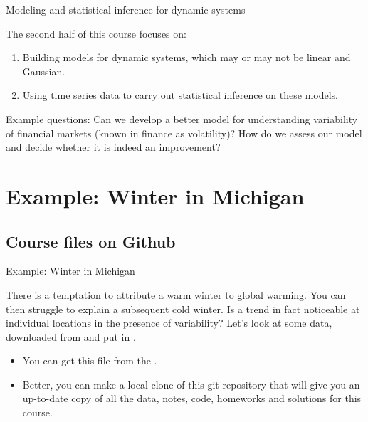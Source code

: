 \begin{frame}{Modeling and statistical inference for dynamic systems}

The second half of this course focuses on:
\begin{enumerate}
\item
 Building models for dynamic systems, which may or may not be linear and Gaussian.
\item
Using time series data to carry out statistical inference on these models.
\end{enumerate}

Example questions: Can we develop a better model for understanding variability of financial markets (known in finance as volatility)? How do we assess our model and decide whether it is indeed an improvement?

\end{frame}

\section{Example: Winter in Michigan}

\subsection{Course files on Github}

\begin{frame}[fragile]{Example: Winter in Michigan}

There is a temptation to attribute a warm winter to global warming. You can then struggle to explain a subsequent cold winter. Is a trend in fact noticeable at individual locations in the presence of variability? Let's look at some data, downloaded from  and put in . 

\begin{itemize}

\item You can get this file from the .

\item Better, you can make a local clone of this git repository that will give you an up-to-date copy of all the data, notes, code, homeworks and solutions for this course.

\end{itemize}

\begin{knitrout}\small
{}\color{fgcolor}\begin{kframe}
\begin{alltt}
 \hlkwb{<-} \hldef{(}\hldef{=}\hldef{,}\hldef{=}\hldef{)}
\end{alltt}
\end{kframe}
\end{knitrout}

\end{frame}

